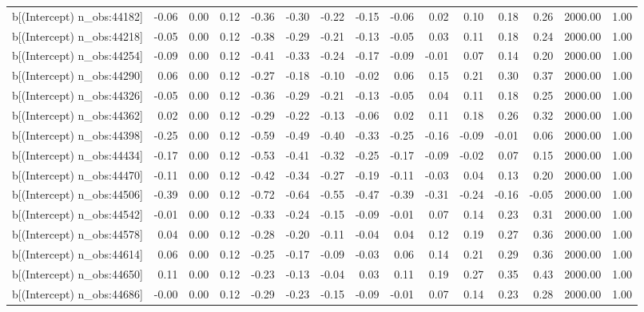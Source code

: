 \begin{table}[ht]
\begin{tabular}{rrrrrrrrrrrrrrr}
  b[(Intercept) n\_obs:44182] & -0.06 & 0.00 & 0.12 & -0.36 & -0.30 & -0.22 & -0.15 & -0.06 & 0.02 & 0.10 & 0.18 & 0.26 & 2000.00 & 1.00 \\ 
  b[(Intercept) n\_obs:44218] & -0.05 & 0.00 & 0.12 & -0.38 & -0.29 & -0.21 & -0.13 & -0.05 & 0.03 & 0.11 & 0.18 & 0.24 & 2000.00 & 1.00 \\ 
  b[(Intercept) n\_obs:44254] & -0.09 & 0.00 & 0.12 & -0.41 & -0.33 & -0.24 & -0.17 & -0.09 & -0.01 & 0.07 & 0.14 & 0.20 & 2000.00 & 1.00 \\ 
  b[(Intercept) n\_obs:44290] & 0.06 & 0.00 & 0.12 & -0.27 & -0.18 & -0.10 & -0.02 & 0.06 & 0.15 & 0.21 & 0.30 & 0.37 & 2000.00 & 1.00 \\ 
  b[(Intercept) n\_obs:44326] & -0.05 & 0.00 & 0.12 & -0.36 & -0.29 & -0.21 & -0.13 & -0.05 & 0.04 & 0.11 & 0.18 & 0.25 & 2000.00 & 1.00 \\ 
  b[(Intercept) n\_obs:44362] & 0.02 & 0.00 & 0.12 & -0.29 & -0.22 & -0.13 & -0.06 & 0.02 & 0.11 & 0.18 & 0.26 & 0.32 & 2000.00 & 1.00 \\ 
  b[(Intercept) n\_obs:44398] & -0.25 & 0.00 & 0.12 & -0.59 & -0.49 & -0.40 & -0.33 & -0.25 & -0.16 & -0.09 & -0.01 & 0.06 & 2000.00 & 1.00 \\ 
  b[(Intercept) n\_obs:44434] & -0.17 & 0.00 & 0.12 & -0.53 & -0.41 & -0.32 & -0.25 & -0.17 & -0.09 & -0.02 & 0.07 & 0.15 & 2000.00 & 1.00 \\ 
  b[(Intercept) n\_obs:44470] & -0.11 & 0.00 & 0.12 & -0.42 & -0.34 & -0.27 & -0.19 & -0.11 & -0.03 & 0.04 & 0.13 & 0.20 & 2000.00 & 1.00 \\ 
  b[(Intercept) n\_obs:44506] & -0.39 & 0.00 & 0.12 & -0.72 & -0.64 & -0.55 & -0.47 & -0.39 & -0.31 & -0.24 & -0.16 & -0.05 & 2000.00 & 1.00 \\ 
  b[(Intercept) n\_obs:44542] & -0.01 & 0.00 & 0.12 & -0.33 & -0.24 & -0.15 & -0.09 & -0.01 & 0.07 & 0.14 & 0.23 & 0.31 & 2000.00 & 1.00 \\ 
  b[(Intercept) n\_obs:44578] & 0.04 & 0.00 & 0.12 & -0.28 & -0.20 & -0.11 & -0.04 & 0.04 & 0.12 & 0.19 & 0.27 & 0.36 & 2000.00 & 1.00 \\ 
  b[(Intercept) n\_obs:44614] & 0.06 & 0.00 & 0.12 & -0.25 & -0.17 & -0.09 & -0.03 & 0.06 & 0.14 & 0.21 & 0.29 & 0.36 & 2000.00 & 1.00 \\ 
  b[(Intercept) n\_obs:44650] & 0.11 & 0.00 & 0.12 & -0.23 & -0.13 & -0.04 & 0.03 & 0.11 & 0.19 & 0.27 & 0.35 & 0.43 & 2000.00 & 1.00 \\ 
  b[(Intercept) n\_obs:44686] & -0.00 & 0.00 & 0.12 & -0.29 & -0.23 & -0.15 & -0.09 & -0.01 & 0.07 & 0.14 & 0.23 & 0.28 & 2000.00 & 1.00 \\ 

\end{tabular}
\end{table}
